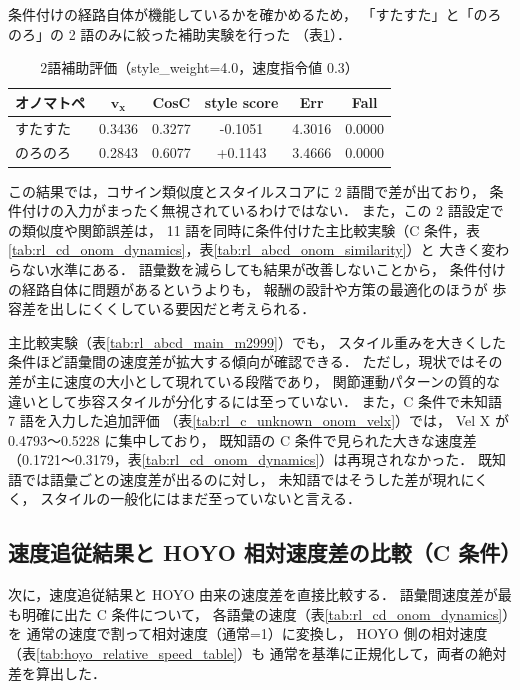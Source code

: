 条件付けの経路自体が機能しているかを確かめるため，
「すたすた」と「のろのろ」の 2 語のみに絞った補助実験を行った
（表\ref{tab:rl_two_style_ablation_stylew4_cmd03}）．

\begin{table}[H]
  \centering
  \caption{2語補助評価（style\_weight=4.0，速度指令値 0.3）}
  \label{tab:rl_two_style_ablation_stylew4_cmd03}
  \begin{tabular}{lccccc} \toprule
    \textbf{オノマトペ} & $\mathbf{v_x}$ & \textbf{CosC} & \textbf{style score} & \textbf{Err} & \textbf{Fall} \\ \midrule
    すたすた & 0.3436 & 0.3277 & -0.1051 & 4.3016 & 0.0000 \\
    のろのろ & 0.2843 & 0.6077 & +0.1143 & 3.4666 & 0.0000 \\ \bottomrule
  \end{tabular}
\end{table}

この結果では，コサイン類似度とスタイルスコアに 2 語間で差が出ており，
条件付けの入力がまったく無視されているわけではない．
また，この 2 語設定での類似度や関節誤差は，
11 語を同時に条件付けた主比較実験（C 条件，表\ref{tab:rl_cd_onom_dynamics}，表\ref{tab:rl_abcd_onom_similarity}）と
大きく変わらない水準にある．
語彙数を減らしても結果が改善しないことから，
条件付けの経路自体に問題があるというよりも，
報酬の設計や方策の最適化のほうが
歩容差を出しにくくしている要因だと考えられる．

主比較実験（表\ref{tab:rl_abcd_main_m2999}）でも，
スタイル重みを大きくした条件ほど語彙間の速度差が拡大する傾向が確認できる．
ただし，現状ではその差が主に速度の大小として現れている段階であり，
関節運動パターンの質的な違いとして歩容スタイルが分化するには至っていない．
また，C 条件で未知語 7 語を入力した追加評価
（表\ref{tab:rl_c_unknown_onom_velx}）では，
Vel X が 0.4793〜0.5228 に集中しており，
既知語の C 条件で見られた大きな速度差
（0.1721〜0.3179，表\ref{tab:rl_cd_onom_dynamics}）は再現されなかった．
既知語では語彙ごとの速度差が出るのに対し，
未知語ではそうした差が現れにくく，
スタイルの一般化にはまだ至っていないと言える．

\subsection{速度追従結果と HOYO 相対速度差の比較（C 条件）}
\label{subsec:discussion_c_vs_hoyo_speed}

次に，速度追従結果と HOYO 由来の速度差を直接比較する．
語彙間速度差が最も明確に出た C 条件について，
各語彙の速度（表\ref{tab:rl_cd_onom_dynamics}）を
通常の速度で割って相対速度（通常=1）に変換し，
HOYO 側の相対速度（表\ref{tab:hoyo_relative_speed_table}）も
通常を基準に正規化して，両者の絶対差を算出した．

